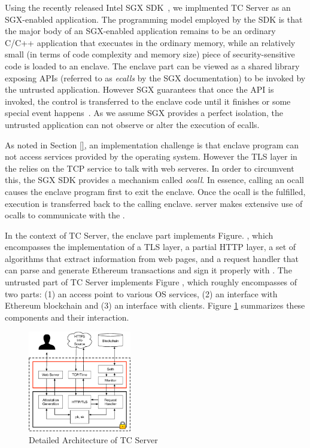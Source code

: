 

Using the recently released Intel SGX SDK~\cite{sgxsdk}, we implmented TC Server
as an SGX-enabled application. The programming model employed by the SDK is 
that the major body of an SGX-enabled
application remains to be an ordinary C/C++ application that execuates in the
ordinary memory, while an relatively small (in terms of code complexity and
memory size) piece of security-sensitive code is loaded to an enclave. 
The enclave part can be
viewed as a shared library exposing APIs (referred to as \emph{ecalls} by the
SGX documentation) to be invoked by the untrusted application. However SGX
guarantees that once the API is invoked, the control is transferred to the 
enclave code until it finishes or some special event happens~\cite{sgxmanual}.
As we assume SGX provides a perfect isolation, the untrusted application can not
observe or alter the execution of ecalls.

As noted in Section \ref{}, an implementation challenge is that enclave program
can not access services provided by the operating system.  However the TLS layer
in the \encname relies on the TCP service to talk with web serveres. In order to
circumvent this, the SGX SDK provides a mechanism called \emph{ocall}. In
essence, calling an ocall causes the enclave program first to exit the enclave.
Once the ocall is the fulfilled, execution is transferred back to the calling
enclave.  \tc server makes extensive use of ocalls to communicate with the
\medname. 

In the context of TC Server, the enclave part implements Figure. , which encompasses the implementation of a TLS layer, a partial HTTP
layer, a set of algorithms that extract information from web pages, and a
request handler that can parse and generate Ethereum transactions and sign it
properly with \skTC.  The untrusted part of TC Server implements Figure , which roughly encompasses of two parts: (1) an access point to various
OS services, (2) an interface with Ethereum blockchain and (3) an interface with
clients. Figure \ref{fig:tcserver_impl} summarizes these components and their
interaction.

\begin{figure}[h]
    \centering
    \includegraphics[width=0.4\textwidth]{figures/impl}
    \caption{Detailed Architecture of TC Server}
    \label{fig:tcserver_impl}
\end{figure}

